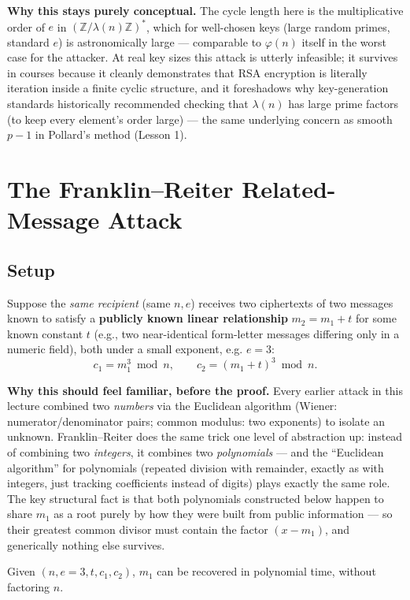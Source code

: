 \medskip\noindent\textbf{Why this stays purely conceptual.} The cycle length here is the multiplicative order of $e$ in $(\mathbb{Z}/\lambda(n)\mathbb{Z})^{*}$, which for well-chosen keys (large random primes, standard $e$) is astronomically large — comparable to $\varphi(n)$ itself in the worst case for the attacker. At real key sizes this attack is utterly infeasible; it survives in courses because it cleanly demonstrates that RSA encryption is literally iteration inside a finite cyclic structure, and it foreshadows why key-generation standards historically recommended checking that $\lambda(n)$ has large prime factors (to keep every element's order large) — the same underlying concern as smooth $p-1$ in Pollard's method (Lesson 1).

\newpage
\section{The Franklin--Reiter Related-Message Attack}

\subsection{Setup}
Suppose the \emph{same recipient} (same $n, e$) receives two ciphertexts of two messages known to satisfy a \textbf{publicly known linear relationship} $m_2 = m_1 + t$ for some known constant $t$ (e.g., two near-identical form-letter messages differing only in a numeric field), both under a small exponent, e.g. $e=3$:
\[
c_1 = m_1^{3} \bmod n, \qquad c_2 = (m_1+t)^{3} \bmod n.
\]

\medskip\noindent\textbf{Why this should feel familiar, before the proof.} Every earlier attack in this lecture combined two \emph{numbers} via the Euclidean algorithm (Wiener: numerator/denominator pairs; common modulus: two exponents) to isolate an unknown. Franklin--Reiter does the same trick one level of abstraction up: instead of combining two \emph{integers}, it combines two \emph{polynomials} — and the ``Euclidean algorithm'' for polynomials (repeated division with remainder, exactly as with integers, just tracking coefficients instead of digits) plays exactly the same role. The key structural fact is that both polynomials constructed below happen to share $m_1$ as a root purely by how they were built from public information — so their greatest common divisor must contain the factor $(x-m_1)$, and generically nothing else survives.

\begin{theorem}
Given $(n, e{=}3, t, c_1, c_2)$, $m_1$ can be recovered in polynomial time, without factoring $n$.
\end{theorem}

